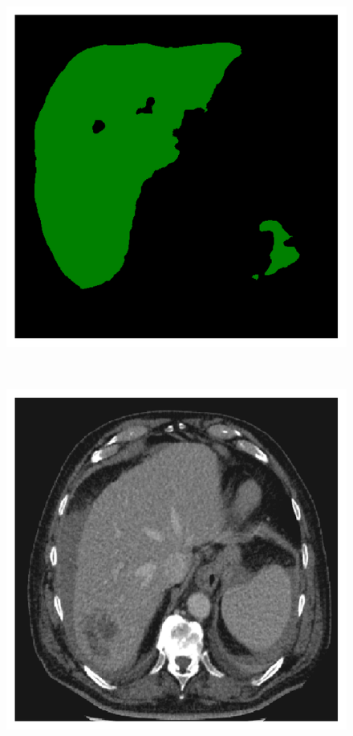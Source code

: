 \begin{figure}[!ht]
\begin{minipage}{4cm}
	\end{minipage} \hspace{-0.3cm}
	\begin{minipage}{4cm}
		\includegraphics[width=\linewidth]{images/ResizeLiverVE_Pred_Pat0_3}
	\end{minipage} \\
	\begin{minipage}{4cm}
		\includegraphics[width=\linewidth]{images/ResizeLiverVE_Raw_Pat4_5}

\end{minipage}
\end{figure}
